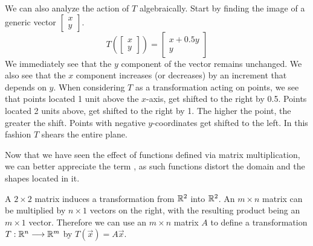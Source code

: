 \documentclass{ximera}
\begin{document}
We can also analyze the action of $T$ algebraically.  Start by finding the image of a generic vector $\begin{bmatrix}x\\y\end{bmatrix}$.
$$T\left(\begin{bmatrix}x\\y\end{bmatrix}\right)=\begin{bmatrix}x+0.5y\\y\end{bmatrix}$$
We immediately see that the $y$ component of the vector remains unchanged.  We also see that the $x$ component increases (or decreases) by an increment that depends on $y$.  When considering $T$ as a transformation acting on points, we see that points located 1 unit above the $x$-axis, get shifted to the right by 0.5.  Points located 2 units above, get shifted to the right by 1. The higher the point, the greater the shift.  Points with negative $y$-coordinates get shifted to the left. In this fashion $T$ shears the entire plane.

 Now that we have seen the effect of functions defined via matrix multiplication, we can better appreciate the term , as such functions distort the domain and the shapes located in it.

A $2\times 2$ matrix induces a transformation from $\mathbb{R}^2$ into $\mathbb{R}^2$.  An $m\times n$ matrix can be multiplied by $n\times 1$ vectors on the right, with the resulting product being an $m\times 1$ vector.  Therefore we can use an $m\times n$ matrix $A$ to define a transformation $T:\mathbb{R}^n\longrightarrow \mathbb{R}^m$ by $T(\vec{x})=A\vec{x}$.
\end{document}
